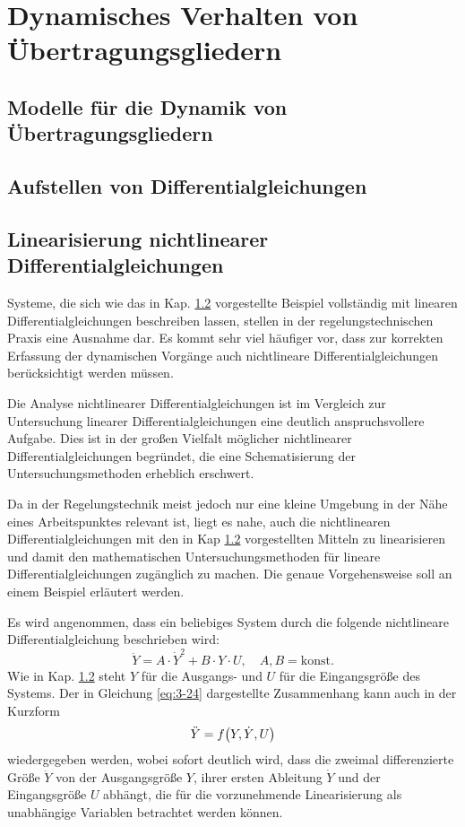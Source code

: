 \section{Dynamisches Verhalten von Übertragungsgliedern}


\subsection{Modelle für die Dynamik von Übertragungsgliedern}


\subsection{Aufstellen von Differentialgleichungen}\label{sec:3-2}


\subsection{Linearisierung nichtlinearer Differentialgleichungen}

Systeme, die sich wie das in Kap. \ref{sec:3-2} vorgestellte Beispiel vollständig mit linearen Differentialgleichungen beschreiben lassen, stellen in der regelungstechnischen Praxis eine Ausnahme dar.
Es kommt sehr viel häufiger vor, dass zur korrekten Erfassung der dynamischen Vorgänge auch nichtlineare Differentialgleichungen berücksichtigt werden müssen.

Die Analyse nichtlinearer Differentialgleichungen ist im Vergleich zur Untersuchung linearer Differentialgleichungen eine deutlich anspruchsvollere Aufgabe.
Dies ist in der großen Vielfalt möglicher nichtlinearer Differentialgleichungen begründet, die eine Schematisierung der Untersuchungsmethoden erheblich erschwert.

Da in der Regelungstechnik meist jedoch nur eine kleine Umgebung in der Nähe eines Arbeitspunktes relevant ist, liegt es nahe, auch die nichtlinearen Differentialgleichungen mit den in Kap \ref{sec:3-2} vorgestellten Mitteln zu linearisieren und damit den mathematischen Untersuchungsmethoden für lineare Differentialgleichungen zugänglich zu machen.
Die genaue Vorgehensweise soll an einem Beispiel erläutert werden.

Es wird angenommen, dass ein beliebiges System durch die folgende nichtlineare Differentialgleichung beschrieben wird:
\begin{equation}\label{eq:3-24}
	\ddot{Y} = A \cdot \dot{Y}^2 + B \cdot Y \cdot U, \quad A, B = \text{konst.}
\end{equation}
Wie in Kap. \ref{sec:3-2} steht \(Y\) für die Ausgangs- und \(U\) für die Eingangsgröße des Systems. Der in Gleichung \eqref{eq:3-24} dargestellte Zusammenhang kann auch in der Kurzform
\begin{equation}
	\ddot{Y} = f\parentheses*{Y, \dot{Y}, U}
\end{equation}
wiedergegeben werden, wobei sofort deutlich wird, dass die zweimal differenzierte Größe \(\ddot{Y}\) von der Ausgangsgröße \(Y\), ihrer ersten Ableitung \(\dot{Y}\) und der Eingangsgröße \(U\) abhängt, die für die vorzunehmende Linearisierung als unabhängige Variablen betrachtet werden können.

